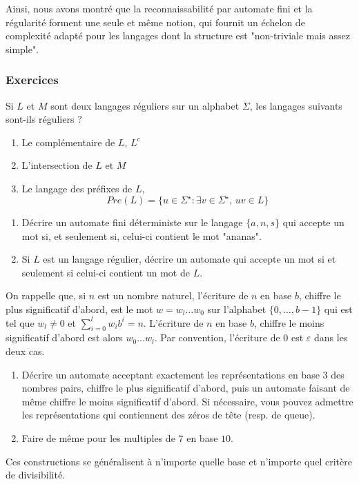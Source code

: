 Ainsi, nous avons montré que la reconnaissabilité par automate fini et la régularité forment une seule et même notion, qui fournit un échelon de complexité adapté pour les langages dont la structure est "non-triviale mais assez simple".


\subsubsection{Exercices}


\begin{exo}
Si $L$ et $M$ sont deux langages réguliers sur un alphabet $\Sigma$, les langages suivants sont-ils réguliers ?
\begin{enumerate}
\item Le complémentaire de $L$, $L^c$
\item L'intersection de $L$ et $M$
\item Le langage des préfixes de $L$,
$$Pre(L)=\{u\in\Sigma^\star : \exists v\in\Sigma^\star ,\, uv\in L\}$$
\end{enumerate}
\end{exo}


\begin{exo}
\begin{enumerate}
\item Décrire un automate fini déterministe sur le langage $\{a, n, s\}$ qui accepte un mot si, et seulement si, celui-ci contient le mot "ananas".
\item Si $L$ est un langage régulier, décrire un automate qui accepte un mot si et seulement si celui-ci contient un mot de $L$.
\end{enumerate}
\end{exo}


\begin{exo}
On rappelle que, si $n$ est un nombre naturel, l'écriture de $n$ en base $b$, chiffre le plus significatif d'abord, est le mot $w=w_l\dots w_0$ sur l'alphabet $\{0, \dots, b-1\}$ qui est tel que $w_l\ne 0$ et $\sum_{i = 0}^l w_ib^i=n$. L'écriture de $n$ en base $b$, chiffre le moins significatif d'abord est alors $w_0\dots w_l$. Par convention, l'écriture de 0 est $\varepsilon$ dans les deux cas.

\begin{enumerate}
\item Décrire un automate acceptant exactement les représentations en base $3$ des nombres pairs, chiffre le plus significatif d'abord, puis un automate faisant de même chiffre le moins significatif d'abord. Si nécessaire, vous pouvez admettre les représentations qui contiennent des zéros de tête (resp. de queue).
\item Faire de même pour les multiples de $7$ en base $10$.
\end{enumerate}

Ces constructions se généralisent à n'importe quelle base et n'importe quel critère de divisibilité.
\end{exo}


